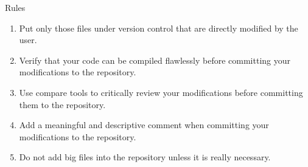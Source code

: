 \documentclass[
 size=12pt,
 paper=smartboard, %
 mode=present, %
 display=slides, %
style=tuliplab,
pauseslide,
fleqn,leqno]{powerdot}
\begin{document}
\begin{slide}[toc=,bm=]{Rules}
	\begin{enumerate}
		\item Put only those files under version control that are directly modified by the user.
		\item Verify that your code can be compiled
		flawlessly before committing your modifications to the repository.
		\item Use compare tools to critically review your modifications before committing 
		them to the repository.
		\item Add a meaningful and descriptive comment when committing your modifications to the repository.
		\item Do not add big files into the repository unless it is really necessary.
	\end{enumerate}
\end{slide}


\end{document}

